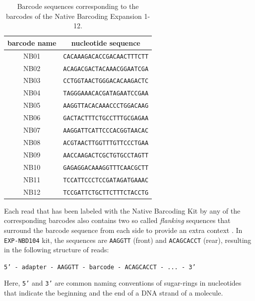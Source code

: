 \begin{table}[!ht]
    \centering
    \begin{tabular}{|c|c|}
        \hline
        barcode name & nucleotide sequence\\
         \hline
        NB01 & \texttt{CACAAAGACACCGACAACTTTCTT}\\
         \hline
        NB02 & \texttt{ACAGACGACTACAAACGGAATCGA}\\
         \hline
        NB03 & \texttt{CCTGGTAACTGGGACACAAGACTC}\\
         \hline
        NB04 & \texttt{TAGGGAAACACGATAGAATCCGAA}\\
         \hline
        NB05 & \texttt{AAGGTTACACAAACCCTGGACAAG}\\
        \hline
        NB06 & \texttt{GACTACTTTCTGCCTTTGCGAGAA}\\
        \hline
        NB07 & \texttt{AAGGATTCATTCCCACGGTAACAC}\\
        \hline
        NB08 & \texttt{ACGTAACTTGGTTTGTTCCCTGAA}\\
        \hline
        NB09 & \texttt{AACCAAGACTCGCTGTGCCTAGTT}\\
        \hline
        NB10 & \texttt{GAGAGGACAAAGGTTTCAACGCTT}\\
        \hline
        NB11 & \texttt{TCCATTCCCTCCGATAGATGAAAC}\\
        \hline
        NB12 & \texttt{TCCGATTCTGCTTCTTTCTACCTG}\\
        \hline
    \end{tabular}
    \caption[Barcode sequences]{Barcode sequences corresponding to the barcodes of the Native Barcoding Expansion 1-12.}
    \label{tab:barcodes}
\end{table}

Each read that has been labeled with the Native Barcoding Kit by any of the corresponding barcodes also contains two so called \textit{flanking} sequences that surround the barcode sequence from each side to provide an extra context \cite{BarcodesONT}. In \texttt{EXP-NBD104} kit, the sequences are \texttt{AAGGTT} (front) and \texttt{ACAGCACCT} (rear), resulting in the following structure of reads:

\bigskip
\begin{center}
\texttt{5' - adapter - AAGGTT - barcode - ACAGCACCT - ... - 3'}
\end{center}
\bigskip

Here, \texttt{5'} and \texttt{3'} are common naming conventions of sugar-rings in nucleotides that indicate the beginning and the end of a DNA strand of a molecule.

